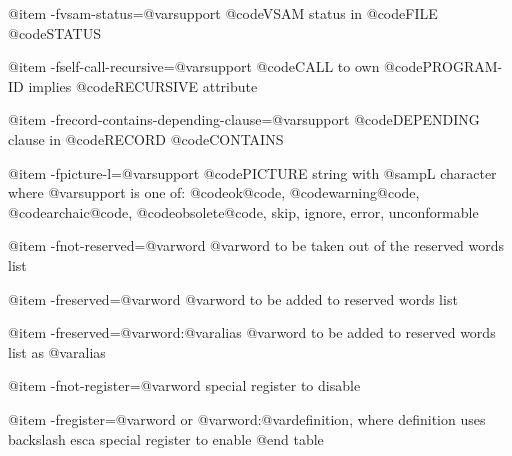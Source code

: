 @item -fvsam-status=@var{support}
@code{VSAM} status in @code{FILE} @code{STATUS}

@item -fself-call-recursive=@var{support}
@code{CALL} to own @code{PROGRAM-ID} implies @code{RECURSIVE} attribute

@item -frecord-contains-depending-clause=@var{support}
@code{DEPENDING} clause in @code{RECORD} @code{CONTAINS}

@item -fpicture-l=@var{support}
@code{PICTURE} string with @samp{L} character
	where @var{support} is one of:
	@code{ok@code{, @code{warning@code{, @code{archaic@code{, @code{obsolete@code{, }skip}, }ignore}, }error}, }unconformable}

@item -fnot-reserved=@var{word}
@var{word} to be taken out of the reserved words list

@item -freserved=@var{word}
@var{word} to be added to reserved words list

@item -freserved=@var{word}:@var{alias}
@var{word} to be added to reserved words list as @var{alias}

@item -fnot-register=@var{word}
special register to disable

@item -fregister=@var{word} or @var{word}:@var{definition}, where definition uses backslash esca
special register to enable
@end table
